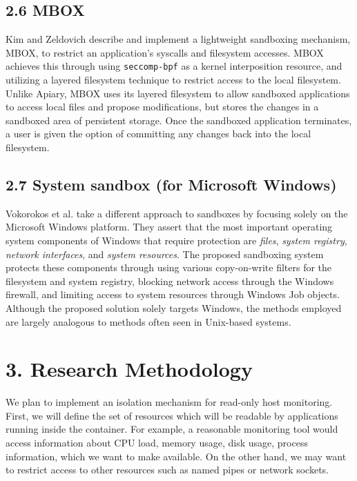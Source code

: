\documentclass{proc}
\begin{document}
\subsection*{2.6 MBOX}

Kim and Zeldovich \cite{kim2013mbox} describe and implement a lightweight sandboxing mechanism, MBOX, to restrict an application's syscalls and filesystem accesses. MBOX achieves this through using \texttt{seccomp-bpf} as a kernel interposition resource, and utilizing a layered filesystem technique to restrict access to the local filesystem. Unlike Apiary, MBOX uses its layered filesystem to allow sandboxed applications to access local files and propose modifications, but stores the changes in a sandboxed area of persistent storage. Once the sandboxed application terminates, a user is given the option of committing any changes back into the local filesystem.

\subsection*{2.7 System sandbox (for Microsoft Windows)}

Vokorokos et al. \cite{vokorokos2015sandboxMSWIN} take a different approach to sandboxes by focusing solely on the Microsoft Windows platform. They assert that the most important operating system components of Windows that require protection are \textit{files}, \textit{system registry}, \textit{network interfaces}, and \textit{system resources}. The proposed sandboxing system protects these components through using various copy-on-write filters for the filesystem and system registry, blocking network access through the Windows firewall, and limiting access to system resources through Windows Job objects. Although the proposed solution solely targets Windows, the methods employed are largely analogous to methods often seen in Unix-based systems.

\section*{3. Research Methodology}
We plan to implement an isolation mechanism for read-only host monitoring. First, we will define the set of resources which will be readable by applications running inside the container. For example, a reasonable monitoring tool would access information about CPU load, memory usage, disk usage, process information, which we want to make available. On the other hand, we may want to restrict access to other resources such as named pipes or network sockets.
\end{document}

